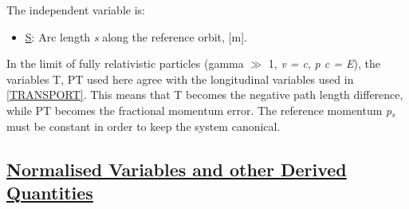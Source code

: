 The independent variable is: 
\begin{itemize}
	\item \href{s}{S}: Arc length \textit{s} along the reference
          orbit, [m].   
\end{itemize} 

In the limit of fully relativistic particles (gamma $\gg$ 1, \textit{v
  = c}, \textit{p c = E}), the variables T, PT used here agree with the
longitudinal variables used in
\href{bibliography.html#transport}{[TRANSPORT]}. This means that T
becomes the negative path length difference, while PT becomes the
fractional momentum error. The reference momentum \textit{p$_s$} must be
constant in order to keep the system canonical.  

\subsection{\href{normal}{Normalised Variables and other Derived Quantities}}
\label{subsec:tables_normal}

